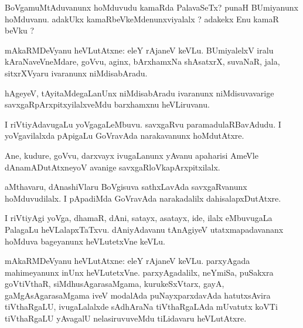 \documentclass{article}
\begin{document}
\begin{mn}
BoVgamuMtAduvanunx hoMduvudu kamaRda PalavaSeTx? punaH BUmiyanunx hoMduvanu. adakUkx 
kamaRbeVkeMdenunxviyalalx ? adakekx Enu kamaR beVku ?
\end{mn}

\begin{mn}
mAkaRMDeVyanu heVLutAtxne: eleY rAjaneV keVLu. BUmiyalelxV iralu kAraNaveVneMdare, goVvu, aginx,
bArxhamxNa shAsatxrX, suvaNaR, jala, sitxrXVyaru ivaranunx niMdisabAradu. 
\end{mn}

\begin{mn}
hAgeyeV, tAyitaMdegaLanUnx niMdisabAradu ivaranunx niMdisuvavarige savxgaRpArxpitxyilalxveMdu 
barxhamxnu heVLiruvanu.
\end{mn}

\begin{mn}
I riVtiyAdavugaLu yoVgagaLeMbuvu. savxgaRvu paramadulaRBavAdudu. I yoVgavilalxda pApigaLu 
GoVravAda narakavanunx hoMdutAtxre.
\end{mn}

\begin{mn}
Ane, kudure, goVvu, darxvayx ivugaLanunx yAvanu apaharisi AmeVle dAnamADutAtxneyoV avanige 
savxgaRloVkapArxpitxilalx.
\end{mn}

\begin{mn}
aMthavaru, dAnashiVlaru BoVgisuva sathxLavAda savxgaRvanunx hoMduvudilalx. I pApadiMda GoVravAda 
narakadalilx dahisalapxDutAtxre.
\end{mn}

\begin{mn}
I riVtiyAgi yoVga, dhamaR, dAni, satayx, asatayx, ide, ilalx eMbuvugaLa PalagaLu heVLalapxTaTxvu. 
dAniyAdavanu tAnAgiyeV utatxmapadavananx hoMduva bageyanunx heVLutetxVne keVLu.
\end{mn}



\begin{mn}
mAkaRMDeVyanu heVLutAtxne: eleY rAjaneV keVLu. parxyAgada mahimeyanunx inUnx heVLutetxVne.
parxyAgadalilx, neYmiSa, puSakxra goVtiVthaR, siMdhusAgarasaMgama, kurukeSxVtarx, gayA, 
gaMgAsAgarasaMgama iveV modalAda puNayxparxdavAda hatutxsAvira tiVthaRgaLU, ivugaLalalxde 
sAdhAraNa tiVthaRgaLAda mUvatutx koVTi tiVthaRgaLU yAvagalU nelasiruvuveMdu tiLidavaru heVLutAtxre.
\end{mn}
\end{document}
